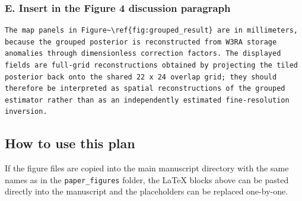 \subsubsection*{E. Insert in the Figure 4 discussion paragraph}

\begin{verbatim}
The map panels in Figure~\ref{fig:grouped_result} are in millimeters, because the grouped posterior is reconstructed from W3RA storage anomalies through dimensionless correction factors. The displayed fields are full-grid reconstructions obtained by projecting the tiled posterior back onto the shared 22 x 24 overlap grid; they should therefore be interpreted as spatial reconstructions of the grouped estimator rather than as an independently estimated fine-resolution inversion.
\end{verbatim}

\subsection*{How to use this plan}

If the figure files are copied into the main manuscript directory with the same names as in the \texttt{paper\_figures} folder, the LaTeX blocks above can be pasted directly into the manuscript and the placeholders can be replaced one-by-one.
